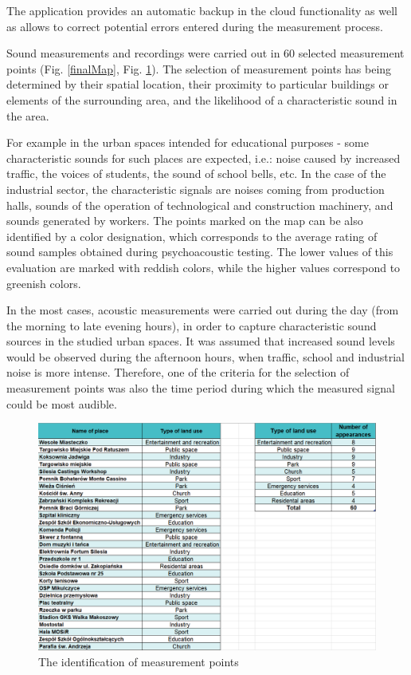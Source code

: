 \documentclass[a4paper,10pt]{article}
\begin{document}
\begin{multicols}{2}
The application provides an automatic backup in the cloud functionality as well
  as allows to correct potential errors entered during the measurement process.

  Sound measurements and recordings were carried out in 60 selected measurement
  points (Fig. \ref{finalMap}, Fig. \ref{finalTable}). The selection of measurement points has being
  determined by their spatial location, their proximity to particular buildings
  or elements of the surrounding area, and the likelihood of a characteristic
  sound in the area.

  For example in the urban spaces intended for educational purposes - some
  characteristic sounds for such places are expected, i.e.: noise caused by
  increased traffic, the voices of students, the sound of school bells, etc. In
  the case of the industrial sector, the characteristic signals are noises
  coming from production halls, sounds of the operation of technological and
  construction machinery, and sounds generated by workers. The points marked on
  the map can be also identified by a color designation, which corresponds to
  the average rating of sound samples obtained during psychoacoustic testing.
  The lower values of this evaluation are marked with reddish colors, while the
  higher values correspond to greenish colors.

  In the most cases, acoustic measurements were carried out during the day (from
  the morning to late evening hours), in order to capture characteristic sound
  sources in the studied urban spaces. It was assumed that increased sound
  levels would be observed during the afternoon hours, when traffic, school and
  industrial noise is more intense. Therefore, one of the criteria for the
  selection of measurement points was also the time period during which the
  measured signal could be most audible.
\end{multicols}

\begin{figure}[H]
  \includegraphics[scale=.3]{fig6.png}
  \centering
  \caption{The identification of measurement points}
  \label{finalTable}
\end{figure}
\end{document}
